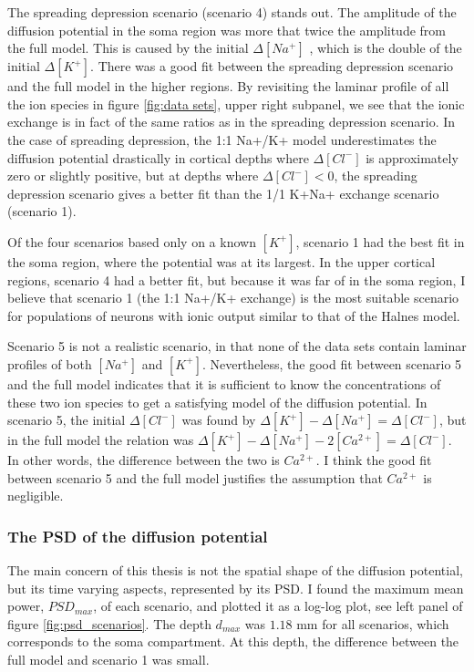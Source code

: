 \documentclass{article}
\begin{document}
The spreading depression scenario (scenario 4) stands out. The amplitude of the diffusion potential in the soma region was more that twice the amplitude from the full model. This is caused by the initial $\Delta [Na^+]$ , which is the double of the initial $\Delta[K^+]$. There was a good fit between the spreading depression scenario and the full model in the higher regions. By revisiting the laminar profile of all the ion species in figure \ref{fig:data sets}, upper right subpanel, we see that the ionic exchange is in fact of the same ratios as in the spreading depression scenario. In the case of spreading depression, the 1:1 Na+/K+ model underestimates the diffusion potential drastically in cortical depths where $\Delta [Cl^-]$ is approximately zero or slightly positive, but at depths where  $\Delta [Cl^-]<0$, the spreading depression scenario gives a better fit than the 1/1 K+Na+ exchange scenario (scenario 1).

Of the four scenarios based only on a known $[K^+]$, scenario 1 had the best fit in the soma region, where the potential was at its largest. In the upper cortical regions, scenario 4 had a better fit, but because it was far of in the soma region, I believe that scenario 1 (the 1:1 Na+/K+ exchange) is the most suitable scenario for populations of neurons with ionic output similar to that of the Halnes model. 

Scenario 5 is not a realistic scenario, in that none of the data sets contain laminar profiles of both $[Na^+]$ and $[K^+]$. Nevertheless, the good fit between scenario 5 and the full model indicates that it is sufficient to know the concentrations of these two ion species to get a satisfying model of the diffusion potential. In scenario 5, the initial $\Delta[Cl^-]$ was found by $\Delta[K^+]-\Delta [Na^+] =\Delta [Cl^-]$, but in the full model the relation was $\Delta[K^+]-\Delta [Na^+] -2[Ca^{2+}]=\Delta [Cl^-]$. In other words, the difference between the two is $Ca^{2+}$. I think the good fit between scenario 5 and the full model justifies the assumption that $Ca^{2+}$ is negligible. 

\subsubsection{The PSD of the diffusion potential}
The main concern of this thesis is not the spatial shape of the diffusion potential, but its time varying aspects, represented by its PSD. I found the maximum mean power, $PSD_{max}$, of each scenario, and plotted it as a log-log plot, see left panel of figure \ref{fig:psd_scenarios}. The depth $d_{max}$ was $1.18$ mm for all scenarios, which corresponds to the soma compartment. At this depth, the difference between the full model and scenario 1 was small.
\end{document}
